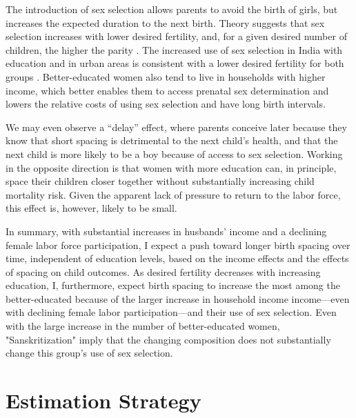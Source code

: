 \documentclass[12pt,letterpaper]{article}
\begin{document}
The introduction of sex selection allows parents to avoid the birth of girls,
but increases the expected duration to the next birth.
Theory suggests that sex selection increases with lower desired fertility, and, for a 
given desired number of children, the higher the parity \citep{Portner2015b}.
The increased use of sex selection in India with education and in urban
areas is consistent with a lower desired fertility for both groups
\citep{das_gupta97,retherford03b,Guilmoto2009a,Portner2015b,Jayachandran2017}.
Better-educated women also tend to live in households with higher income, which better 
enables them to access prenatal sex determination and lowers the relative costs of using 
sex selection and have long birth intervals.

We may even observe a ``delay'' effect, where parents conceive later because they know 
that short spacing is detrimental to the next child's health, and that the next child is 
more likely to be a boy because of access to sex selection.
Working in the opposite direction is that women with more education can, in principle, 
space their children closer together without substantially increasing child mortality 
risk.
Given the apparent lack of pressure to return to the labor force,
this effect is, however, likely to be small.

In summary, with substantial increases in husbands' income and a declining female labor 
force participation, I expect a push toward longer birth spacing over time, independent
of education levels, based on the income effects and the effects of spacing
on child outcomes.
As desired fertility decreases with increasing education, I, furthermore, expect 
birth spacing to increase the most among the better-educated because of the larger
increase in household income income---even with declining female labor participation---and 
their use of sex selection.
Even with the large increase in the number of better-educated women, "Sanskritization" 
imply that the changing composition does not substantially change this group's use of 
sex selection.




\section{Estimation Strategy\label{sec:strategy}}

\end{document}

